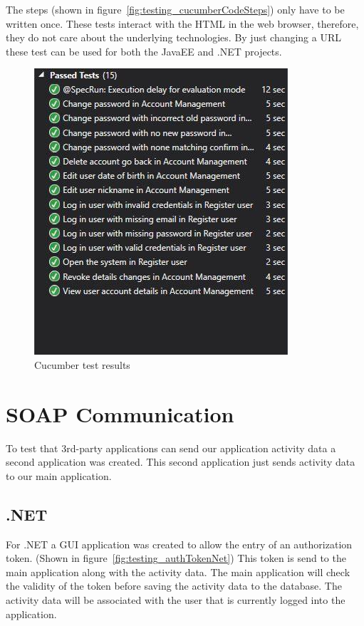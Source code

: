 The steps (shown in figure~\ref{fig:testing_cucumberCodeSteps}) only have to be written once. These tests interact with the HTML in the web browser, therefore, they do not care about the underlying technologies. By just changing a URL these test can be used for both the JavaEE and .NET projects. 

\begin{figure}[H]
\begin{center}
\includegraphics[scale=0.6]{images/testing/cucumberPassedTests.jpg} 
\caption{Cucumber test results}
\label{fig:testing_cucumberPassedTests}
\end{center}
\end{figure}


\section{SOAP Communication}
To test that 3rd-party applications can send our application activity data a second application was created. This second application just sends activity data to our main application. 

\subsection{.NET}
For .NET a GUI application was created to allow the entry of an authorization token. (Shown in figure~\ref{fig:testing_authTokenNet}) This token is send to the main application along with the activity data. The main application will check the validity of the token before saving the activity data to the database. The activity data will be associated with the user that is currently logged into the application.

